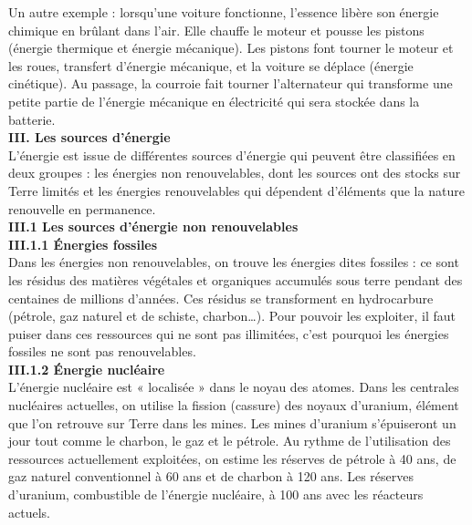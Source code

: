 \documentclass[8pt]{article}
\begin{document}
Un autre exemple : lorsqu’une voiture fonctionne, l’essence libère son énergie chimique en brûlant dans l’air. Elle chauffe le moteur et pousse les pistons (énergie thermique et énergie mécanique). Les pistons font tourner le moteur et les roues, transfert d’énergie mécanique, et la voiture se déplace (énergie cinétique). Au passage, la courroie fait tourner l’alternateur qui transforme une petite partie de l’énergie mécanique en électricité qui sera stockée dans la batterie.\\

\textbf{III. Les sources d'énergie}\\

L’énergie est issue de différentes sources d’énergie qui peuvent être classifiées en deux groupes : les énergies non renouvelables, dont les sources ont des stocks sur Terre limités et les énergies renouvelables qui dépendent d’éléments que la nature renouvelle en permanence. \\

\textbf{III.1 Les sources d'énergie non renouvelables}\\

\textbf{III.1.1 Énergies fossiles }\\

Dans les énergies non renouvelables, on trouve les énergies dites fossiles : ce sont les résidus des matières végétales et organiques accumulés sous terre pendant des centaines de millions d’années. Ces résidus se transforment en hydrocarbure (pétrole, gaz naturel et de schiste, charbon…). Pour pouvoir les exploiter, il faut puiser dans ces ressources qui ne sont pas illimitées, c’est pourquoi les énergies fossiles ne sont pas renouvelables. \\

\textbf{III.1.2 Énergie nucléaire}\\

L’énergie nucléaire est « localisée » dans le noyau des atomes. Dans les centrales nucléaires actuelles, on utilise la fission (cassure) des noyaux d’uranium, élément que l’on retrouve sur Terre dans les mines. Les mines d’uranium s’épuiseront un jour tout comme le charbon, le gaz et le pétrole.
Au rythme de l’utilisation des ressources actuellement exploitées, on estime les réserves de pétrole à 40 ans, de gaz naturel conventionnel à 60 ans et de charbon à 120 ans. Les réserves d’uranium, combustible de l’énergie nucléaire, à 100 ans avec les réacteurs actuels. \\
\end{document}
